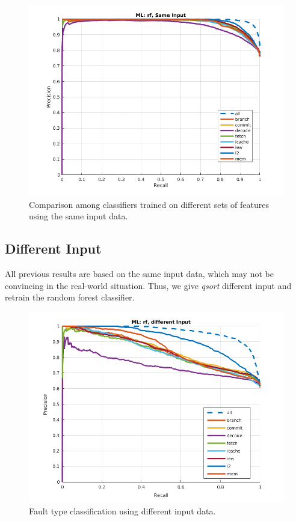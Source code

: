 \begin{figure}[t]
\begin{center}
   \includegraphics[width=0.95\linewidth]{./figures/sidf.png}
\end{center}
\vspace{-0.3cm}
   \caption{Comparison among classifiers trained on different sets of features using the same input data.}
\label{fig:sidf}
\vspace{-0.3cm}
\end{figure}

\subsection{Different Input}
All previous results are based on the same input data, which may not be convincing in the real-world situation. Thus, we give \emph{qsort} different input and retrain the random forest classifier.

\begin{figure}[t]
\begin{center}
   \includegraphics[width=0.8\linewidth]{./figures/didf.png}
\end{center}
\vspace{-0.3cm}
   \caption{Fault type classification using different input data.}
\label{fig:didf}
\vspace{-0.3cm}
\end{figure}

